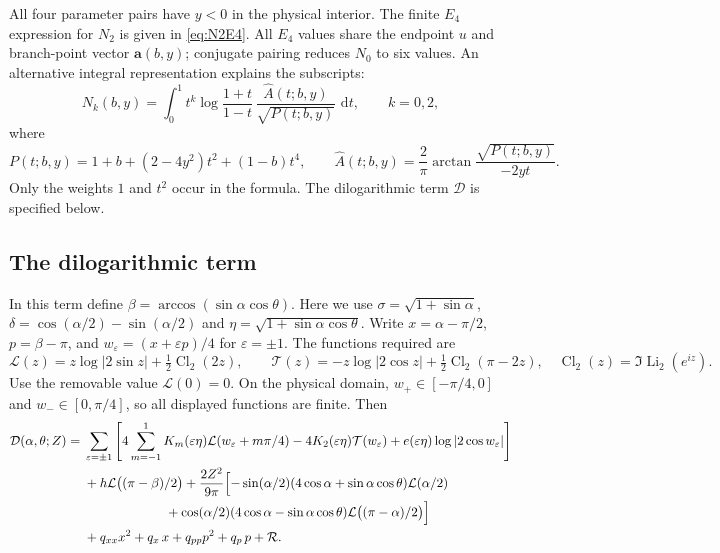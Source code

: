 \documentclass[10pt]{article}
\newcommand{\dd}{\,\mathrm d}
\newcommand{\Cl}{\operatorname{Cl}_2}
\newcommand{\Li}{\operatorname{Li}_2}
\begin{document}
All four parameter pairs have $y<0$ in the physical interior.
The finite $E_4$ expression for $N_2$ is given in \eqref{eq:N2E4}.
All $E_4$ values share the endpoint $u$ and branch-point vector $\mathbf a(b,y)$; conjugate pairing reduces $N_0$ to six values.
An alternative integral representation explains the subscripts:
\begin{equation}\label{eq:moment-integral}
 N_k(b,y)=\int_0^1 t^k\log\frac{1+t}{1-t}\,
 \frac{\widehat A(t;b,y)}{\sqrt{P(t;b,y)}}\,\dd t,\qquad k=0,2,
\end{equation}
where
\[
 P(t;b,y)=1+b+(2-4y^2)t^2+(1-b)t^4,\qquad
 \widehat A(t;b,y)=\frac2\pi\arctan\frac{\sqrt{P(t;b,y)}}{-2yt}.
\]
Only the weights $1$ and $t^2$ occur in the formula.
The dilogarithmic term $\mathcal D$ is specified below.

\subsection*{The dilogarithmic term}
In this term define $\beta=\arccos(\sin\alpha\cos\theta)$.
Here we use $\sigma=\sqrt{1+\sin\alpha}$, $\delta=\cos(\alpha/2)-\sin(\alpha/2)$ and $\eta=\sqrt{1+\sin\alpha\cos\theta}$.
Write $x=\alpha-\pi/2$, $p=\beta-\pi$, and $w_\varepsilon=(x+\varepsilon p)/4$ for $\varepsilon=\pm1$.
The functions required are
\begin{equation}
 \mathcal L(z)=z\log|2\sin z|+\tfrac12\Cl(2z),\qquad
 \mathcal T(z)=-z\log|2\cos z|+\tfrac12\Cl(\pi-2z),\quad
 \Cl(z)=\Im\Li(e^{iz}).
\end{equation}
Use the removable value $\mathcal L(0)=0$.
On the physical domain, $w_+\in[-\pi/4,0]$ and $w_-\in[0,\pi/4]$, so all displayed functions are finite.
Then
\begin{equation}\label{eq:dilogarithmic}
\begin{aligned}
 \mathcal D(\alpha,\theta;Z)={}&\sum_{\varepsilon=\pm1}\left[
 4\sum_{m=-1}^1K_m(\varepsilon\eta)\mathcal L(w_\varepsilon+m\pi/4)
 -4K_2(\varepsilon\eta)\mathcal T(w_\varepsilon)
 +e(\varepsilon\eta)\log|2\cos w_\varepsilon|\right]\\
 &+h\mathcal L\bigl((\pi-\beta)/2\bigr)
 +\frac{2Z^2}{9\pi}\Bigl[
 -\sin(\alpha/2)(4\cos\alpha+\sin\alpha\cos\theta)\mathcal L(\alpha/2)\\
 &\hspace{22mm}+\cos(\alpha/2)(4\cos\alpha-\sin\alpha\cos\theta)
 \mathcal L\bigl((\pi-\alpha)/2\bigr)\Bigr]\\
 &+q_{xx}x^2+q_x\,x+q_{pp}p^2+q_p\,p+\mathcal R.
\end{aligned}
\end{equation}
\end{document}
